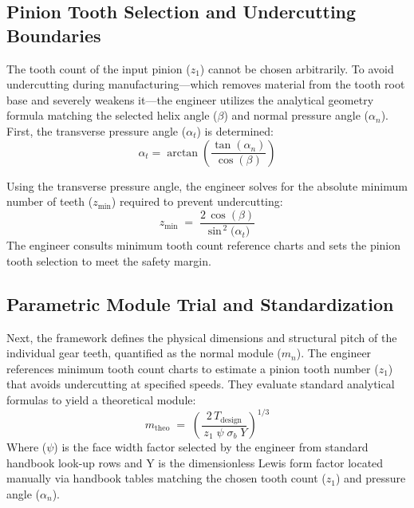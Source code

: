 	\subsection{Pinion Tooth Selection and Undercutting Boundaries}
		The tooth count of the input pinion ($z_{1}$) cannot be chosen arbitrarily. To avoid undercutting during manufacturing—which 
		removes material from the tooth root base and severely weakens it—the engineer utilizes the analytical geometry formula 
		matching the selected helix angle ($\beta$) and normal pressure angle ($\alpha_{n}$). First, the transverse pressure angle 
		($\alpha_{t}$) is determined: 	
			\begin{equation}
				\label{eq:transversepressureangle}
				\alpha_{t}
				= \operatorname{\arctan}\!\left(
				\frac{\tan(\alpha_{n})}{\cos(\beta)}
				\right)
			\end{equation}

		Using the transverse pressure angle, the engineer solves for the absolute minimum number of teeth ($z_{\min}$) required to prevent undercutting: 
			\begin{equation}
				\label{eq:absoluteminnumofteeth}
				z_{\min}
				\;=\;
				\frac{2\,\cos(\beta)}{\sin^{\,2}\!\bigl(\alpha_t\bigr)}
			\end{equation}
		The engineer consults minimum tooth count reference charts and sets the pinion tooth selection to meet the safety margin. 

	\subsection{Parametric Module Trial and Standardization}
		Next, the framework defines the physical dimensions and structural pitch of the individual gear teeth, quantified as the 
		normal module ($m_{n}$). The engineer references minimum tooth count charts to estimate a pinion tooth number ($z_{1}$) that avoids undercutting 
		at specified speeds. They evaluate standard analytical formulas to yield a theoretical module: 
			\begin{equation}
				\label{eq:theoreticalmodule}
				m_{\text{theo}}
				\;=\;
				\left(\frac{2\,T_{\text{design}}}{\,z_{1}\;\psi\;\sigma_{b}\;Y}\right)^{1/3}
			\end{equation}
		Where ($\psi$) is the face width factor selected by the engineer from standard handbook look-up rows 
		and Y is the dimensionless Lewis form factor located manually via handbook tables matching the 
		chosen tooth count ($z_{1}$) and pressure angle ($\alpha_{n}$).
	
